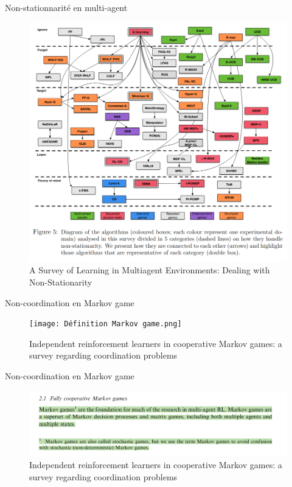 \documentclass[aspectratio=169,xcolor=dvipsnames]{beamer}
\begin{document}
\begin{frame}{Non-stationnarité en multi-agent}
  \begin{figure}
    \centering
    \includegraphics[scale=0.20]{algomultiagent.png}
    \caption{\citet{hernandez-leal_survey_2019} A Survey of Learning in Multiagent Environments:  Dealing with Non-Stationarity}
  \end{figure}
\end{frame}

\begin{frame}{Non-coordination en Markov game}
  \begin{figure}
    \centering
    \texttt{[image: Définition Markov game.png]}
    \caption{\citet{matignon_independent_2012} Independent reinforcement learners in cooperative Markov games: a survey regarding coordination problems}
  \end{figure}
\end{frame}

\begin{frame}{Non-coordination en Markov game}
  \begin{figure}
    \centering
    \includegraphics[scale=0.20]{Lien MDP.png}
    \caption{\citet{matignon_independent_2012} Independent reinforcement learners in cooperative Markov games: a survey regarding coordination problems}
  \end{figure}
\end{frame}
\end{document}

